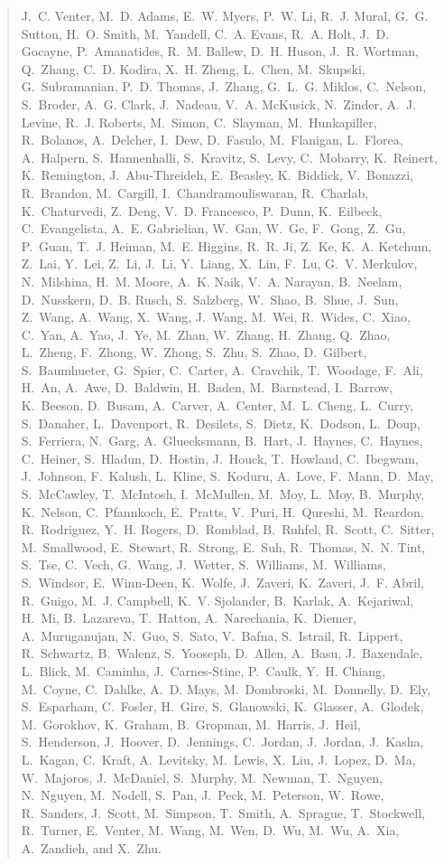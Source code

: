 \documentclass[natbib,authoryear]{sigtbd17-style}
\begin{document}
\begin{quote}\sloppy
J.~C. Venter, M.~D. Adams, E.~W. Myers, P.~W. Li, R.~J. Mural, G.~G. Sutton,
  H.~O. Smith, M.~Yandell, C.~A. Evans, R.~A. Holt, J.~D. Gocayne,
  P.~Amanatides, R.~M. Ballew, D.~H. Huson, J.~R. Wortman, Q.~Zhang, C.~D.
  Kodira, X.~H. Zheng, L.~Chen, M.~Skupski, G.~Subramanian, P.~D. Thomas,
  J.~Zhang, G.~L.~G. Miklos, C.~Nelson, S.~Broder, A.~G. Clark, J.~Nadeau,
  V.~A. McKusick, N.~Zinder, A.~J. Levine, R.~J. Roberts, M.~Simon, C.~Slayman,
  M.~Hunkapiller, R.~Bolanos, A.~Delcher, I.~Dew, D.~Fasulo, M.~Flanigan,
  L.~Florea, A.~Halpern, S.~Hannenhalli, S.~Kravitz, S.~Levy, C.~Mobarry,
  K.~Reinert, K.~Remington, J.~Abu-Threideh, E.~Beasley, K.~Biddick,
  V.~Bonazzi, R.~Brandon, M.~Cargill, I.~Chandramouliswaran, R.~Charlab,
  K.~Chaturvedi, Z.~Deng, V.~D. Francesco, P.~Dunn, K.~Eilbeck, C.~Evangelista,
  A.~E. Gabrielian, W.~Gan, W.~Ge, F.~Gong, Z.~Gu, P.~Guan, T.~J. Heiman, M.~E.
  Higgins, R.~R. Ji, Z.~Ke, K.~A. Ketchum, Z.~Lai, Y.~Lei, Z.~Li, J.~Li,
  Y.~Liang, X.~Lin, F.~Lu, G.~V. Merkulov, N.~Milshina, H.~M. Moore, A.~K.
  Naik, V.~A. Narayan, B.~Neelam, D.~Nusskern, D.~B. Rusch, S.~Salzberg,
  W.~Shao, B.~Shue, J.~Sun, Z.~Wang, A.~Wang, X.~Wang, J.~Wang, M.~Wei,
  R.~Wides, C.~Xiao, C.~Yan, A.~Yao, J.~Ye, M.~Zhan, W.~Zhang, H.~Zhang,
  Q.~Zhao, L.~Zheng, F.~Zhong, W.~Zhong, S.~Zhu, S.~Zhao, D.~Gilbert,
  S.~Baumhueter, G.~Spier, C.~Carter, A.~Cravchik, T.~Woodage, F.~Ali, H.~An,
  A.~Awe, D.~Baldwin, H.~Baden, M.~Barnstead, I.~Barrow, K.~Beeson, D.~Busam,
  A.~Carver, A.~Center, M.~L. Cheng, L.~Curry, S.~Danaher, L.~Davenport,
  R.~Desilets, S.~Dietz, K.~Dodson, L.~Doup, S.~Ferriera, N.~Garg,
  A.~Gluecksmann, B.~Hart, J.~Haynes, C.~Haynes, C.~Heiner, S.~Hladun,
  D.~Hostin, J.~Houck, T.~Howland, C.~Ibegwam, J.~Johnson, F.~Kalush, L.~Kline,
  S.~Koduru, A.~Love, F.~Mann, D.~May, S.~McCawley, T.~McIntosh, I.~McMullen,
  M.~Moy, L.~Moy, B.~Murphy, K.~Nelson, C.~Pfannkoch, E.~Pratts, V.~Puri,
  H.~Qureshi, M.~Reardon, R.~Rodriguez, Y.~H. Rogers, D.~Romblad, B.~Ruhfel,
  R.~Scott, C.~Sitter, M.~Smallwood, E.~Stewart, R.~Strong, E.~Suh, R.~Thomas,
  N.~N. Tint, S.~Tse, C.~Vech, G.~Wang, J.~Wetter, S.~Williams, M.~Williams,
  S.~Windsor, E.~Winn-Deen, K.~Wolfe, J.~Zaveri, K.~Zaveri, J.~F. Abril,
  R.~Guigo, M.~J. Campbell, K.~V. Sjolander, B.~Karlak, A.~Kejariwal, H.~Mi,
  B.~Lazareva, T.~Hatton, A.~Narechania, K.~Diemer, A.~Muruganujan, N.~Guo,
  S.~Sato, V.~Bafna, S.~Istrail, R.~Lippert, R.~Schwartz, B.~Walenz,
  S.~Yooseph, D.~Allen, A.~Basu, J.~Baxendale, L.~Blick, M.~Caminha,
  J.~Carnes-Stine, P.~Caulk, Y.~H. Chiang, M.~Coyne, C.~Dahlke, A.~D. Mays,
  M.~Dombroski, M.~Donnelly, D.~Ely, S.~Esparham, C.~Fosler, H.~Gire,
  S.~Glanowski, K.~Glasser, A.~Glodek, M.~Gorokhov, K.~Graham, B.~Gropman,
  M.~Harris, J.~Heil, S.~Henderson, J.~Hoover, D.~Jennings, C.~Jordan,
  J.~Jordan, J.~Kasha, L.~Kagan, C.~Kraft, A.~Levitsky, M.~Lewis, X.~Liu,
  J.~Lopez, D.~Ma, W.~Majoros, J.~McDaniel, S.~Murphy, M.~Newman, T.~Nguyen,
  N.~Nguyen, M.~Nodell, S.~Pan, J.~Peck, M.~Peterson, W.~Rowe, R.~Sanders,
  J.~Scott, M.~Simpson, T.~Smith, A.~Sprague, T.~Stockwell, R.~Turner,
  E.~Venter, M.~Wang, M.~Wen, D.~Wu, M.~Wu, A.~Xia, A.~Zandieh, and X.~Zhu.
\end{quote}
\end{document}
